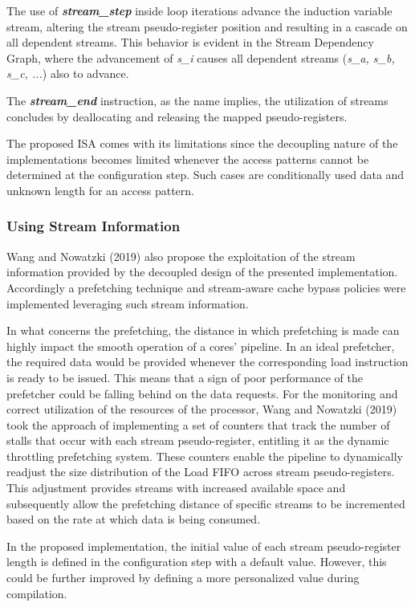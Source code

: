 The use of \textbf{\textit{stream\_step}} inside loop iterations advance the induction variable stream, altering the stream pseudo-register position and resulting in a cascade on all dependent streams. This behavior is evident in the Stream Dependency Graph, where the advancement of \textit{s\_i} causes all dependent streams (\textit{s\_a, s\_b, s\_c, ...}) also to advance.

The \textbf{\textit{stream\_end}} instruction, as the name implies, the utilization of streams concludes by deallocating and releasing the mapped pseudo-registers.

The proposed \acrshort{ISA} comes with its limitations since the decoupling nature of the implementations becomes limited whenever the access patterns cannot be determined at the configuration step. Such cases are conditionally used data and unknown length for an access pattern.


\subsubsection{Using Stream Information}
Wang and Nowatzki (2019) \cite{8980305} also propose the exploitation of the stream information provided by the decoupled design of the presented implementation. Accordingly a prefetching technique and stream-aware cache bypass policies were implemented leveraging such stream information.

In what concerns the prefetching, the distance in which prefetching is made can highly impact the smooth operation of a cores' pipeline. In an ideal prefetcher, the required data would be provided whenever the corresponding load instruction is ready to be issued. This means that a sign of poor performance of the prefetcher could be falling behind on the data requests. For the monitoring and correct utilization of the resources of the processor, Wang and Nowatzki (2019) \cite{8980305} took the approach of implementing a set of counters that track the number of stalls that occur with each stream pseudo-register, entitling it as the dynamic throttling prefetching system. These counters enable the pipeline to dynamically readjust the size distribution of the Load FIFO across stream pseudo-registers. This adjustment provides streams with increased available space and subsequently allow the prefetching distance of specific streams to be incremented based on the rate at which data is being consumed.

In the proposed implementation, the initial value of each stream pseudo-register length is defined in the configuration step with a default value. However, this could be further improved by defining a more personalized value during compilation.

